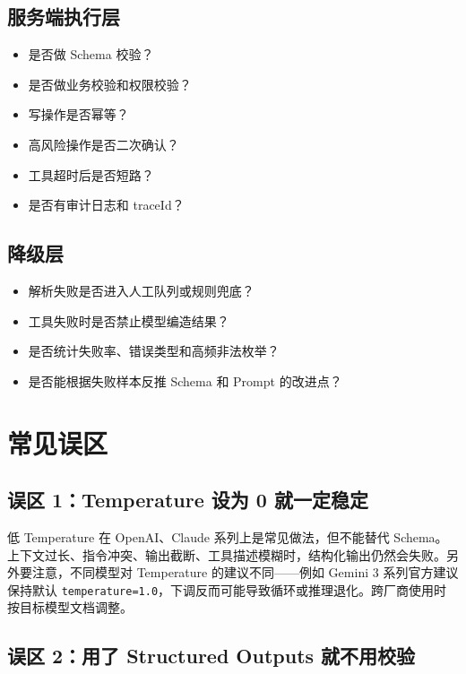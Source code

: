 \documentclass[9pt,a4paper,twocolumn]{ctexart}
\begin{document}
\subsection*{服务端执行层}

\begin{itemize}[itemsep=1pt, topsep=2pt]
  \item 是否做 Schema 校验？
  \item 是否做业务校验和权限校验？
  \item 写操作是否幂等？
  \item 高风险操作是否二次确认？
  \item 工具超时后是否短路？
  \item 是否有审计日志和 traceId？
\end{itemize}


\subsection*{降级层}

\begin{itemize}[itemsep=1pt, topsep=2pt]
  \item 解析失败是否进入人工队列或规则兜底？
  \item 工具失败时是否禁止模型编造结果？
  \item 是否统计失败率、错误类型和高频非法枚举？
  \item 是否能根据失败样本反推 Schema 和 Prompt 的改进点？
\end{itemize}


\section*{常见误区}


\subsection*{误区 1：Temperature 设为 0 就一定稳定}


低 Temperature 在 OpenAI、Claude 系列上是常见做法，但不能替代 Schema。上下文过长、指令冲突、输出截断、工具描述模糊时，结构化输出仍然会失败。另外要注意，不同模型对 Temperature 的建议不同——例如 Gemini 3 系列官方建议保持默认 \texttt{temperature=1.0}，下调反而可能导致循环或推理退化。跨厂商使用时按目标模型文档调整。



\subsection*{误区 2：用了 Structured Outputs 就不用校验}
\end{document}

